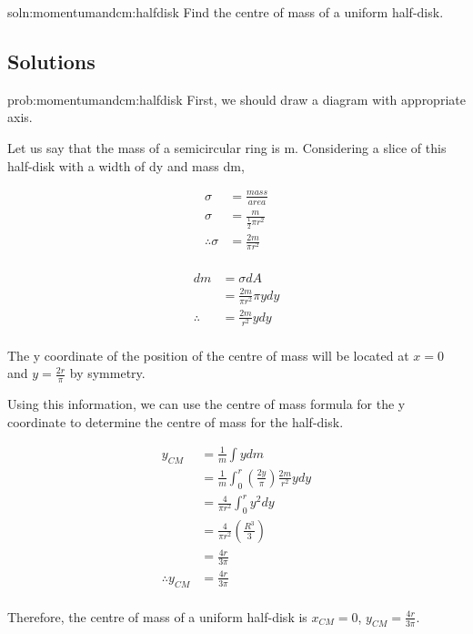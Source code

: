 \begin{problem}{soln:momentumandcm:halfdisk}{\label{prob:momencumandcm:halfdisk} Find the centre of mass of a uniform half-disk.}
\end{problem}

\newpage
\subsection{Solutions}

\begin{solution}{prob:momentumandcm:halfdisk}\label{soln:momentumandcm:halfdisk} 
First, we should draw a diagram with appropriate axis.


Let us say that the mass of a semicircular ring is m. Considering a slice of this half-disk with a width of dy and mass dm,

\begin{align*}
\sigma &=\frac{mass}{area} \\
\sigma &=\frac{m}{\frac{1}{2}\pi r^{2}} \\
\therefore \sigma &=\frac{2m}{\pi r^{2}} \\
\end{align*}

\begin{align*}
dm&=\sigma dA\\
&=\frac{2m}{\pi r^{2}}\pi ydy\\
\therefore&=\frac{2m}{r^{2}} ydy\\
\end{align*}

The y coordinate of the position of the centre of mass will be located at $x=0$ and $y=\frac{2r}{\pi}$ by symmetry.

Using this information, we can use the centre of mass formula for the y coordinate to determine the centre of mass for the half-disk.

\begin{align*}
y_{CM}&=\frac{1}{m}\int y dm\\
&=\frac{1}{m}\int_{0}^{r} (\frac{2y}{\pi})\frac{2m}{r^{2}}ydy\\
&=\frac{4}{\pi r^{2}}\int_{0}^{r}y^{2}dy\\
&=\frac{4}{\pi r^{2}}(\frac{R^{3}}{3})\\
&=\frac{4r}{3\pi}\\
\therefore y_{CM}&=\frac{4r}{3\pi}\\
\end{align*}

Therefore, the centre of mass of a uniform half-disk is $x_{CM}=0$, $y_{CM}=\frac{4r}{3\pi}$.
\end{solution}